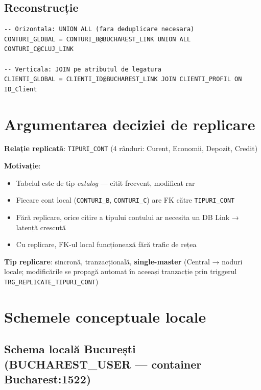 \documentclass[12pt,a4paper]{article}
\begin{document}
\subsection{Reconstrucție}
\begin{lstlisting}[caption={Reconstrucție fragmente — vederi globale}]
-- Orizontala: UNION ALL (fara deduplicare necesara)
CONTURI_GLOBAL = CONTURI_B@BUCHAREST_LINK UNION ALL CONTURI_C@CLUJ_LINK

-- Verticala: JOIN pe atributul de legatura
CLIENTI_GLOBAL = CLIENTI_ID@BUCHAREST_LINK JOIN CLIENTI_PROFIL ON ID_Client
\end{lstlisting}

\section{Argumentarea deciziei de replicare}

\textbf{Relație replicată}: \texttt{TIPURI\_CONT} (4 rânduri: Curent, Economii, Depozit, Credit)

\textbf{Motivație}:
\begin{itemize}
  \item Tabelul este de tip \textit{catalog} — citit frecvent, modificat rar
  \item Fiecare cont local (\texttt{CONTURI\_B}, \texttt{CONTURI\_C}) are FK către \texttt{TIPURI\_CONT}
  \item Fără replicare, orice citire a tipului contului ar necesita un DB Link → latență crescută
  \item Cu replicare, FK-ul local funcționează fără trafic de rețea
\end{itemize}

\textbf{Tip replicare}: sincronă, tranzacțională, \textbf{single-master}
(Central → noduri locale; modificările se propagă automat în aceeași tranzacție
prin triggerul \texttt{TRG\_REPLICATE\_TIPURI\_CONT})

\section{Schemele conceptuale locale}

\subsection{Schema locală București (BUCHAREST\_USER — container Bucharest:1522)}
\end{document}
